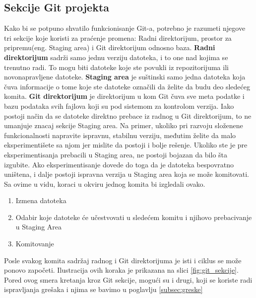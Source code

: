 \documentclass[a4paper]{article}
\begin{document}
{\subsection{Sekcije Git projekta}
\label{subsec:sekcije}
Kako bi se potpuno shvatilo funkcionisanje Git-a, potrebno je razumeti njegove tri sekcije koje koristi za praćenje promena: Radni direktorijum, prostor za pripremu(eng. Staging area) i Git direktorijum odnosno baza. \textbf{Radni direktorijum} sadrži samo jednu verziju datoteka, i to one nad kojima se trenutno radi. To mogu biti datoteke koje ste povukli iz repozitorijuma ili novonapravljene datoteke. \textbf{Staging area} je suštinski samo jedna datoteka koja čuva informacije o tome koje ste datoteke označili da želite da budu deo sledećeg komita. \textbf{Git direktorijum} je direktorijum u kom Git čuva sve meta podatke i bazu podataka svih fajlova koji su pod sistemom za kontrolom verzija. Iako postoji način da se datoteke direktno prebace iz radnog u Git direktorijum, to ne umanjuje znacaj sekcije Staging area. Na primer, ukoliko pri razvoju složenene funkcionalnosti napravite ispravnu, stabilnu verziju, međutim želite da malo eksperimentišete sa njom jer mislite da postoji i bolje rešenje. Ukoliko ste je pre eksperimentisanja prebacili u Staging area, ne postoji bojazan da bilo šta izgubite. Ako eksperimentisanje dovede do toga da je datoteka bespovratno uništena, i dalje postoji ispravna verzija u Staging area koja se može komitovati.\\
Sa ovime u vidu, koraci u okviru jednog komita bi izgledali ovako.
\begin{enumerate}
\item Izmena datoteka
\item Odabir koje datoteke će učestvovati u sledećem komitu i njihovo prebacivanje u Staging Area
\item Komitovanje
\end{enumerate}

Posle svakog komita sadržaj radnog i Git direktorijuma je isti i ciklus se može ponovo započeti. Ilustracija ovih koraka je prikazana na slici \ref{fig:git_sekcije}.\\
Pored ovog smera kretanja kroz Git sekcije, mogući su i drugi, koji se koriste radi ispravljanja grešaka i njima se bavimo u poglavlju \ref{subsec:greske}

}
\end{document}
